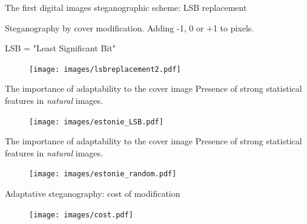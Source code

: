 \documentclass[10pt]{beamer}
\begin{document}
\begin{frame}{The first digital images steganographic scheme: LSB replacement}

Steganography by cover modification. Adding -1, 0 or +1 to pixels.

\alert{LSB} = "\alert{L}east \alert{S}ignificant \alert{B}it"
\begin{figure}[h]
\texttt{[image: images/lsbreplacement2.pdf]}
\end{figure}
\end{frame}

\begin{frame}{The importance of adaptability to the cover image}
Presence of strong \alert{statistical features} in \textit{natural} images.
\begin{figure}[h]
\texttt{[image: images/estonie\_LSB.pdf]}
\end{figure}
\end{frame}

\begin{frame}{The importance of adaptability to the cover image}
Presence of strong \alert{statistical features} in \textit{natural} images.
\begin{figure}[h]
\texttt{[image: images/estonie\_random.pdf]}
\end{figure}
\end{frame}

\begin{frame}{Adaptative steganography: cost of modification}
\begin{figure}[h]
\texttt{[image: images/cost.pdf]}
\end{figure}
\end{frame}
\end{document}
